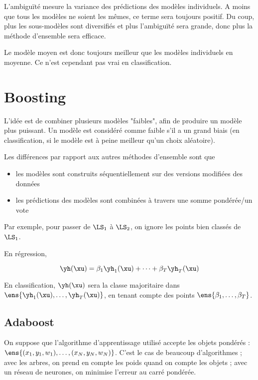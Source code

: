 L'ambiguïté mesure la variance des prédictions des modèles individuels. A moins que tous les modèles ne soient les mêmes, ce terme sera toujours positif. Du coup, plus les sous-modèles sont diversifiés et plus l'ambiguïté sera grande, donc plus la méthode d'ensemble sera efficace.

Le modèle moyen est donc toujours meilleur que les modèles individuels en moyenne. Ce n'est cependant pas vrai en classification.
	
\section{Boosting}
	
L'idée est de combiner plusieurs modèles "faibles", afin de produire un modèle plus puissant. Un modèle est considéré comme faible s'il a un grand biais (en classification, si le modèle est à peine meilleur qu'un choix aléatoire).

Les différences par rapport aux autres méthodes d'ensemble sont que

\begin{itemize}
	\item les modèles sont construits séquentiellement sur des versions modifiées des données
	\item les prédictions des modèles sont combinées à travers une somme pondérée/un vote
\end{itemize}


Par exemple, pour passer de $\LS_1$ à $\LS_2$, on ignore les points bien classés de $\LS_1$.

En régression,

$$\yh(\xu) = \beta_1\yh_1(\xu) + \dots + \beta_T \yh_T(\xu)$$

En classification, $\yh(\xu)$ sera la classe majoritaire dans $\ens{\yh_1(\xu), \dots , \yh_T(\xu)}$, en tenant compte des points $\ens{\beta_1, \dots , \beta_T}$.

	\subsection{Adaboost}
	
	On suppose que l'algorithme d'apprentissage utilisé accepte les objets pondérés : $\ens{(x_1, y_1, w_1), \dots , (x_N, y_N, w_N)}$. C'est le cas de beaucoup d'algorithmes ; avec les arbres, on prend en compte les poids quand on compte les objets ; avec un réseau de neurones, on minimise l'erreur au carré pondérée.
	
